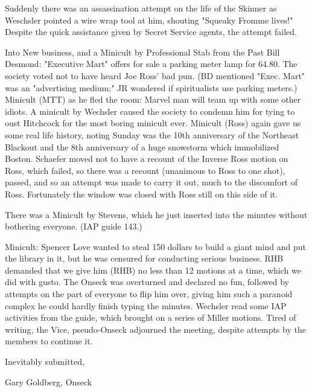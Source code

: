 \documentclass[12pt]{article}
\begin{document}
Suddenly there was an assassination attempt on the life of the Skinner as Weschsler pointed a wire wrap tool at him, shouting "Squeaky Fromme lives!" Despite the quick assistance given by Secret Service agents, the attempt failed.

Into New business, and a Minicult by Professional Stab from the Past Bill Desmond: "Executive Mart" offers for sale a parking meter lamp for 64.80. The society voted not to have heard Joe Ross' bad pun. (BD mentioned "Exec. Mart" was an "advertising medium;" JR wondered if spiritualists use parking meters.) Minicult (MTT) as he fled the room: Marvel man will team up with some other idiots. A minicult by Wechsler caused the society to condemn him for tying to oust Hitchcock for the most boring minicult ever. Minicult (Ross) again gave us some real life history, noting Sunday was the 10th anniversary of the Northeast Blackout and the 8th anniversary of a huge snowstorm which immobilized Boston. Schaefer moved not to have a recount of the Inverse Ross motion on Ross, which failed, so there was a recount (unanimous to Ross to one shot), passed, and so an attempt was made to carry it out, much to the discomfort of Ross. Fortunately the window was closed with Ross still on this side of it.

There was a Minicult by Stevens, which he just inserted into the minutes without bothering everyone. (IAP guide 143.)

Minicult: Spencer Love wanted to steal 150 dollars to build a giant mind and put the library in it, but he was censured for conducting serious business. RHB demanded that we give him (RHB) no less than 12 motions at a time, which we did with gusto. The Onseck was overturned and declared no fun, followed by attempts on the part of everyone to flip him over, giving him such a paranoid complex he could hardly finish typing the minutes. Wechsler read some IAP activities from the guide, which brought on a series of Miller motions. Tired of writing, the Vice, pseudo-Onseck adjourned the meeting, despite attempts by the members to continue it.

\vspace{12pt}

\centerline{Inevitably submitted,}
\centerline{Gary Goldberg, Onseck}
\end{document}
